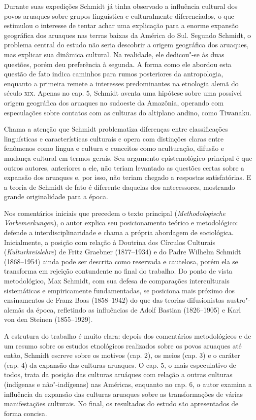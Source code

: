 Durante suas expedições Schmidt já tinha observado a influência cultural
dos povos aruaques sobre grupos linguística e culturalmente
diferenciados, o que estimulou o interesse de tentar achar uma
explicação para a enorme expansão geográfica dos aruaques nas terras
baixas da América do Sul. Segundo Schmidt, o problema central do estudo
não seria descobrir a origem geográfica dos aruaques, mas explicar sua
dinâmica cultural. Na realidade, ele dedicou"-se às duas questões, porém
deu preferência à segunda. A forma como ele abordou esta questão de fato
indica caminhos para rumos posteriores da antropologia, enquanto a
primeira remete a interesses predominantes na etnologia alemã do século
\textsc{xix}. Apenas no cap. 5, Schmidt aventa uma hipótese sobre uma possível
origem geográfica dos aruaques no sudoeste da Amazônia, operando com
especulações sobre contatos com as culturas do altiplano andino, como
Tiwanaku.

Chama a atenção que Schmidt problematiza diferenças entre classificações
linguísticas e características culturais e opera com distinções claras
entre fenômenos como língua e cultura e conceitos como aculturação,
difusão e mudança cultural em termos gerais. Seu argumento
epistemológico principal é que outros autores, anteriores a ele, não
teriam levantado as questões certas sobre a expansão dos aruaques e, por
isso, não teriam chegado a respostas satisfatórias. E a teoria de
Schmidt de fato é diferente daquelas dos antecessores, mostrando grande
originalidade para a época.

Nos comentários iniciais que precedem o texto principal
(\emph{Methodologische Vorbemerkungen}), o autor explica seu
posicionamento teórico e metodológico: defende a interdisciplinaridade
e chama a própria abordagem de sociológica. Inicialmente, a posição com
relação à Doutrina dos Círculos Culturais (\emph{Kulturkreislehre}) de
Fritz Graebner (1877--1934) e do Padre Wilhelm Schmidt (1868--1954) ainda
pode ser descrita como reservada e cautelosa, porém ela se transforma em
rejeição contundente no final do trabalho. Do ponto de vista
metodológico, Max Schmidt, com sua defesa de comparações interculturais
sistemáticas e empiricamente fundamentadas, se posiciona mais próximo
dos ensinamentos de Franz Boas (1858--1942) do que das teorias
difusionistas austro"-alemãs da época, refletindo as influências de
Adolf Bastian (1826--1905) e Karl von den Steinen (1855--1929).

A estrutura do trabalho é muito clara: depois dos comentários
metodológicos e de um resumo sobre os estudos etnológicos realizados
sobre os povos aruaques até então, Schmidt escreve sobre os motivos
(cap. 2), os meios (cap. 3) e o caráter (cap. 4) da expansão das
culturas aruaques. O cap. 5, o mais especulativo de todos, trata da
posição das culturas aruáques com relação a outras culturas (indígenas
e não"-indígenas) nas Américas, enquanto no cap. 6, o autor examina a
influência da expansão das culturas aruaques sobre as transformações de
várias manifestações culturais. No final, os resultados do estudo são
apresentados de forma concisa.

